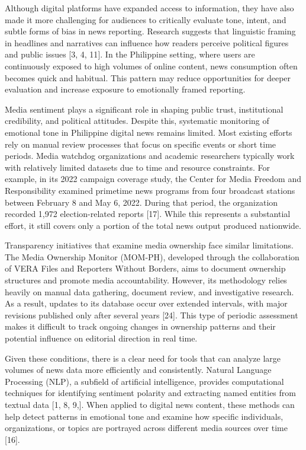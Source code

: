 Although digital platforms have expanded access to information, they have also made it more challenging for audiences to critically evaluate tone, intent, and subtle forms of bias in news reporting. Research suggests that linguistic framing in headlines and narratives can influence how readers perceive political figures and public issues {[}3, 4, 11{]}. In the Philippine setting, where users are continuously exposed to high volumes of online content, news consumption often becomes quick and habitual. This pattern may reduce opportunities for deeper evaluation and increase exposure to emotionally framed reporting.

Media sentiment plays a significant role in shaping public trust, institutional credibility, and political attitudes. Despite this, systematic monitoring of emotional tone in Philippine digital news remains limited. Most existing efforts rely on manual review processes that focus on specific events or short time periods. Media watchdog organizations and academic researchers typically work with relatively limited datasets due to time and resource constraints. For example, in its 2022 campaign coverage study, the Center for Media Freedom and Responsibility examined primetime news programs from four broadcast stations between February 8 and May 6, 2022. During that period, the organization recorded 1,972 election-related reports {[}17{]}. While this represents a substantial effort, it still covers only a portion of the total news output produced nationwide.

Transparency initiatives that examine media ownership face similar limitations. The Media Ownership Monitor (MOM-PH), developed through the collaboration of VERA Files and Reporters Without Borders, aims to document ownership structures and promote media accountability. However, its methodology relies heavily on manual data gathering, document review, and investigative research. As a result, updates to its database occur over extended intervals, with major revisions published only after several years {[}24{]}. This type of periodic assessment makes it difficult to track ongoing changes in ownership patterns and their potential influence on editorial direction in real time.

Given these conditions, there is a clear need for tools that can analyze large volumes of news data more efficiently and consistently. Natural Language Processing (NLP), a subfield of artificial intelligence, provides computational techniques for identifying sentiment polarity and extracting named entities from textual data {[}1, 8, 9,{]}. When applied to digital news content, these methods can help detect patterns in emotional tone and examine how specific individuals, organizations, or topics are portrayed across different media sources over time {[}16{]}.

